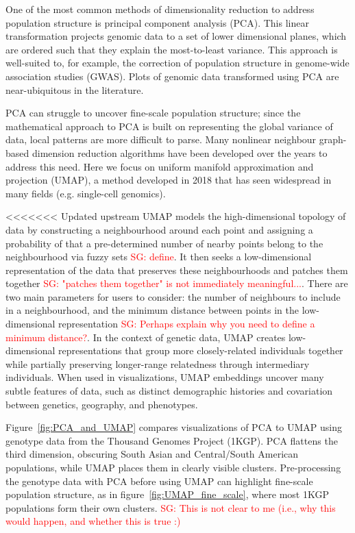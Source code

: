 \documentclass[12pt]{article}
\newcommand{\sgcomment}[1]{\textcolor{red}{SG: #1}}
\begin{document}
One of the most common methods of dimensionality reduction to address population structure is principal component analysis (PCA). This linear transformation projects genomic data to a set of lower dimensional planes, which are ordered such that they explain the most-to-least variance. This approach is well-suited to, for example, the correction of population structure in genome-wide association studies (GWAS).\cite{patterson2006population} Plots of genomic data transformed using PCA are near-ubiquitous in the literature.

PCA can struggle to uncover fine-scale population structure; since the mathematical approach to PCA is built on representing the global variance of data, local patterns are more difficult to parse. Many nonlinear neighbour graph-based dimension reduction algorithms have been developed over the years to address this need. Here we focus on uniform manifold approximation and projection (UMAP)\cite{mcinnes_umap_2018}, a method developed in 2018 that has seen widespread in many fields (e.g. single-cell genomics\cite{becht_dimensionality_2019}). 

<<<<<<< Updated upstream
UMAP models the high-dimensional topology of data by constructing a neighbourhood around each point and assigning a probability of that a pre-determined number of nearby points belong to the neighbourhood via fuzzy sets \sgcomment{define}. It then seeks a low-dimensional representation of the data that preserves these neighbourhoods and patches them together \sgcomment{"patches them together" is not immediately meaningful...}. There are two main parameters for users to consider: the number of neighbours to include in a neighbourhood, and the minimum distance between points in the low-dimensional representation \sgcomment{Perhaps explain why you need to define a minimum distance?}. In the context of genetic data, UMAP creates low-dimensional representations that group more closely-related individuals together while partially preserving longer-range relatedness through intermediary individuals. When used in visualizations, UMAP embeddings uncover many subtle features of data, such as distinct demographic histories and covariation between genetics, geography, and phenotypes\cite{diaz-papkovich_umap_2019}.

Figure~\ref{fig:PCA_and_UMAP} compares visualizations of PCA to UMAP using genotype data from the Thousand Genomes Project (1KGP)\cite{10002015global}. PCA flattens the third dimension, obscuring South Asian and Central/South American populations, while UMAP places them in clearly visible clusters. Pre-processing the genotype data with PCA before using UMAP can highlight fine-scale population structure, as in figure~\ref{fig:UMAP_fine_scale}, where most 1KGP populations form their own clusters. \sgcomment{This is not clear to me (i.e., why this would happen, and whether this is true :)}
\end{document}
